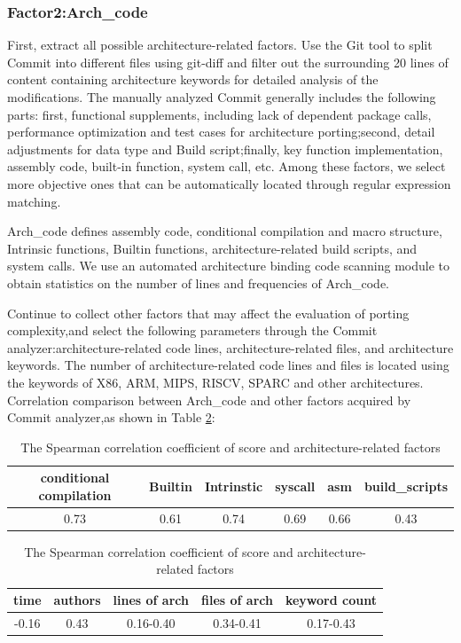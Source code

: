 \documentclass[sigconf,screen,review,anonymous]{acmart}
\begin{document}
\subsubsection{Factor2:Arch\_code}

First, extract all possible architecture-related factors.
Use the Git tool to split Commit into different files using git-diff and filter out the surrounding 20 lines of content containing architecture keywords for detailed analysis of the modifications.
The manually analyzed Commit generally includes the following parts: first, functional supplements, including lack of dependent package calls, performance optimization and test cases for architecture porting;second, detail adjustments for data type and Build script;finally, key function implementation, assembly code, built-in function, system call, etc.
Among these factors, we select more objective ones that can be automatically located through regular expression matching.

Arch\_code defines assembly code, conditional compilation and macro structure, Intrinsic functions, Builtin functions, architecture-related build scripts, and system calls.
We use an automated architecture binding code scanning module to obtain statistics on the number of lines and frequencies of Arch\_code.

Continue to collect other factors that may affect the evaluation of porting complexity,and select the following parameters through the Commit analyzer:architecture-related code lines, architecture-related files, and architecture keywords.
The number of architecture-related code lines and files is located using the keywords of X86, ARM, MIPS, RISCV, SPARC and other architectures.
Correlation comparison between Arch\_code and other factors acquired by Commit analyzer,as shown in Table \ref{tab:score}:

\begin{table}
  \caption{The Spearman correlation coefficient of score and architecture-related factors}
  \label{tab:score}
  \begin{tabular}{cccccc}
    \toprule
    conditional compilation & Builtin & Intrinstic & syscall & asm & build\_scripts \\
    \midrule
    0.73 & 0.61 & 0.74 & 0.69 & 0.66 & 0.43 \\
  \bottomrule
\end{tabular}
\begin{tabular}{ccccc}
  \toprule
  time & authors & lines of arch & files of arch & keyword count \\
  \midrule
  -0.16 & 0.43 & 0.16-0.40 & 0.34-0.41 & 0.17-0.43 \\
\bottomrule
\end{tabular}
\end{table}
\end{document}
